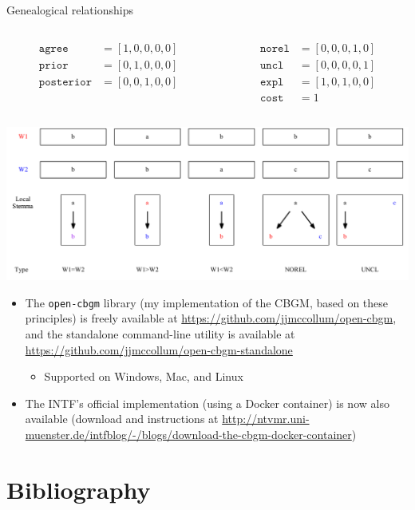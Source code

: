 \documentclass[10pt]{beamer}
\begin{document}
	\begin{frame}
		\begin{center}
			Genealogical relationships
		\end{center}
		\begin{columns}
			\begin{column}{0.45\textwidth}
				\begin{align*}
					\mathtt{agree} &= [1,0,0,0,0]\\
					\mathtt{prior} &= [0,1,0,0,0]\\
					\mathtt{posterior} &= [0,0,1,0,0]\\
					\phantom{*}
				\end{align*}
			\end{column}
			\begin{column}{0.45\textwidth}
				\begin{align*}
					\mathtt{norel} &= [0,0,0,1,0]\\
					\mathtt{uncl} &= [0,0,0,0,1]\\
					\mathtt{expl} &= [1,0,1,0,0]\\
					\mathtt{cost} &= 1
				\end{align*}
			\end{column}
		\end{columns}
		\begin{center}
			\includegraphics[width=\textwidth]{../img/genealogical-relationships.pdf}
		\end{center}
	\end{frame}
	\begin{frame}
		\begin{itemize}
			\item The \texttt{open-cbgm} library (my implementation of the CBGM, based on these principles) is freely available at \url{https://github.com/jjmccollum/open-cbgm}, and the standalone command-line utility is available at \url{https://github.com/jjmccollum/open-cbgm-standalone}
			\begin{itemize}
				\item Supported on Windows, Mac, and Linux
			\end{itemize}
			\item The INTF's official implementation (using a Docker container) is now also available (download and instructions at \url{http://ntvmr.uni-muenster.de/intfblog/-/blogs/download-the-cbgm-docker-container})
		\end{itemize}
	\end{frame}
	\section*{Bibliography}
	\begin{frame}[allowframebreaks]
		\printbibliography
	\end{frame}
\end{document}
